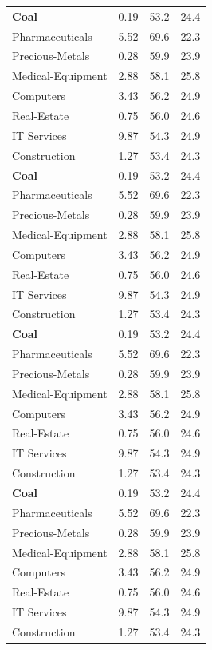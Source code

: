 \documentclass[12pt,twoside,a4paper]{article}
\begin{document}
\begin{longtable}[t]{lccc}
\textbf{Coal}      &  0.19  &  53.2  &  24.4  \\
Pharmaceuticals    &  5.52  &  69.6  &  22.3  \\
Precious-Metals    &  0.28  &  59.9  &  23.9  \\
Medical-Equipment  &  2.88  &  58.1  &  25.8  \\
Computers          &  3.43  &  56.2  &  24.9  \\
Real-Estate        &  0.75  &  56.0  &  24.6  \\
IT Services        &  9.87  &  54.3  &  24.9  \\
Construction       &  1.27  &  53.4  &  24.3  \\

\textbf{Coal}      &  0.19  &  53.2  &  24.4  \\
Pharmaceuticals    &  5.52  &  69.6  &  22.3  \\
Precious-Metals    &  0.28  &  59.9  &  23.9  \\
Medical-Equipment  &  2.88  &  58.1  &  25.8  \\
Computers          &  3.43  &  56.2  &  24.9  \\
Real-Estate        &  0.75  &  56.0  &  24.6  \\
IT Services        &  9.87  &  54.3  &  24.9  \\
Construction       &  1.27  &  53.4  &  24.3  \\

\textbf{Coal}      &  0.19  &  53.2  &  24.4  \\
Pharmaceuticals    &  5.52  &  69.6  &  22.3  \\
Precious-Metals    &  0.28  &  59.9  &  23.9  \\
Medical-Equipment  &  2.88  &  58.1  &  25.8  \\
Computers          &  3.43  &  56.2  &  24.9  \\
Real-Estate        &  0.75  &  56.0  &  24.6  \\
IT Services        &  9.87  &  54.3  &  24.9  \\
Construction       &  1.27  &  53.4  &  24.3  \\

\textbf{Coal}      &  0.19  &  53.2  &  24.4  \\
Pharmaceuticals    &  5.52  &  69.6  &  22.3  \\
Precious-Metals    &  0.28  &  59.9  &  23.9  \\
Medical-Equipment  &  2.88  &  58.1  &  25.8  \\
Computers          &  3.43  &  56.2  &  24.9  \\
Real-Estate        &  0.75  &  56.0  &  24.6  \\
IT Services        &  9.87  &  54.3  &  24.9  \\
Construction       &  1.27  &  53.4  &  24.3  \\


\end{longtable}
\end{document}

